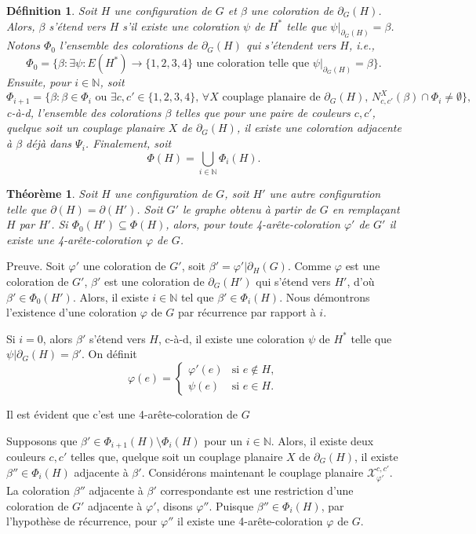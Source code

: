 \documentclass[10pt,a4paper]{article}
\newtheorem{definition}{Définition}
\newtheorem{theorem}{Théorème}
\begin{document}
\begin{definition}
Soit $H$ une configuration de $G$ et $\beta$ une coloration de $\partial_G(H)$. Alors, $\beta$ \emph{s'étend} vers $H$ s'il existe une coloration $\psi$ de $H^*$ telle que $\psi|_{\partial_G(H)} = \beta$. Notons $\Phi_0$ l'ensemble des colorations de $\partial_G(H)$ qui s'étendent vers $H$, i.e.,
$$
\Phi_0 = \{\beta : \exists \psi : E(H^*)\to\{1,2,3,4\} \textrm{ une coloration telle que } \psi|_{\partial_G(H)} = \beta\}.
$$
Ensuite, pour $i\in\mathbb{N}$, soit
$$
\Phi_{i+1} = 
\{ 
\beta : 
\beta\in \Phi_i
\textrm{ ou }
\exists c,c'\in \{1,2,3,4\},\, 
\forall X\textrm{ couplage planaire de $\partial_G(H)$, }
N^X_{c,c'}(\beta) \cap \Phi_i \neq \emptyset 
\},
$$
c-à-d, l'ensemble des colorations $\beta$ telles que pour une paire de couleurs $c,c'$, quelque soit un couplage planaire $X$ de $\partial_G(H)$, il existe une coloration adjacente à $\beta$ déjà dans $\Psi_{i}$. Finalement, soit
$$
\Phi(H)=\bigcup_{i\in \mathbb{N}} \Phi_i(H).
$$
\end{definition}

\begin{theorem}
Soit $H$ une configuration de $G$, soit $H'$ une autre configuration telle que $\partial(H)=\partial(H')$. Soit $G'$ le graphe obtenu à partir de $G$ en remplaçant $H$ par $H'$.
Si $\Phi_0(H')\subseteq \Phi(H)$, alors, pour toute 4-arête-coloration $\varphi'$ de $G'$ il existe une 4-arête-coloration $\varphi$ de $G$.
\label{th:red}
\end{theorem}

Preuve. Soit $\varphi'$ une coloration de $G'$, soit $\beta'=\varphi'|\partial_H(G)$. Comme $\varphi$ est une coloration de $G'$, $\beta'$ est une coloration de $\partial_G(H')$ qui s'étend vers $H'$, d'où $\beta'\in \Phi_0(H')$.
Alors, il existe $i\in \mathbb{N}$ tel que $\beta' \in \Phi_{i}(H)$.
Nous démontrons l'existence d'une coloration $\varphi$ de $G$ par récurrence par rapport à $i$.

Si $i=0$, alors $\beta'$ s'étend vers $H$, c-à-d, il existe une coloration $\psi$ de $H^*$ telle que $\psi|\partial_G(H)=\beta'$. On définit
$$
\varphi (e) = 
\begin{cases}
\varphi'(e) & \text{si }e\notin H, \\
\psi(e) & \text{si } e\in H.
\end{cases}
$$

Il est évident que c'est une 4-arête-coloration de $G$

Supposons que $\beta' \in \Phi_{i+1}(H)\setminus \Phi_i(H)$ pour un $i\in \mathbb{N}$. Alors, il existe deux couleurs $c,c'$ telles que, quelque soit un couplage planaire $X$ de $\partial_G(H)$, il existe $\beta''\in \Phi_i(H)$ adjacente à $\beta'$. Considérons maintenant le couplage planaire $\mathcal{X}_{\varphi'}^{c,c'}$. La coloration $\beta''$ adjacente à $\beta'$ correspondante est une restriction d'une coloration de $G'$ adjacente à $\varphi'$, disons $\varphi''$. Puisque $\beta''\in \Phi_i(H)$, par l'hypothèse de récurrence, pour $\varphi''$ il existe une 4-arête-coloration $\varphi$ de $G$.
\end{document}
